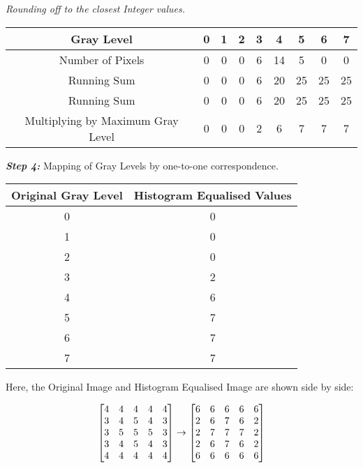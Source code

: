 \textit{Rounding off to the closest Integer values.}

\begin{table*}[h]
    \centering
    \begin{tabular}{|c|c|c|c|c|c|c|c|c|}
        \hline
        Gray Level & 0 & 1 & 2 & 3 & 4 & 5 & 6 & 7\\
        \hline
        Number of Pixels & 0 & 0 & 0 & 6 & 14 & 5 & 0 & 0\\
        \hline
        Running Sum & 0 & 0 & 0 & 6 & 20 & 25 & 25 & 25\\
        \hline
        Running Sum & 0 & 0 & 0 & 6 & 20 & 25 & 25 & 25\\
        \hline
        Multiplying by Maximum Gray Level & 0 & 0 & 0 & 2 & 6 & 7 & 7 & 7\\
        \hline
    \end{tabular}
\end{table*}

\textbf\textit{Step 4:} Mapping of Gray Levels by one-to-one correspondence.

\begin{table*}[h]
    \centering
    \begin{tabular}{|c|c|}
        \hline
        Original Gray Level & Histogram Equalised Values\\
        \hline
        0 & 0\\
        \hline
        1 & 0\\
        \hline
        2 & 0\\
        \hline
        3 & 2\\
        \hline
        4 & 6\\
        \hline
        5 & 7\\
        \hline
        6 & 7\\
        \hline
        7 & 7\\
        \hline
    \end{tabular}
\end{table*}

Here, the Original Image and Histogram Equalised Image are shown side by side:

\begin{equation*}
    \centering
    \begin{bmatrix}
        4 & 4 & 4 & 4 & 4\\
        3 & 4 & 5 & 4 & 3\\
        3 & 5 & 5 & 5 & 3\\
        3 & 4 & 5 & 4 & 3\\
        4 & 4 & 4 & 4 & 4
    \end{bmatrix} \rightarrow \begin{bmatrix}
        6 & 6 & 6 & 6 & 6\\
        2 & 6 & 7 & 6 & 2\\
        2 & 7 & 7 & 7 & 2\\
        2 & 6 & 7 & 6 & 2\\
        6 & 6 & 6 & 6 & 6
    \end{bmatrix}
\end{equation*}

